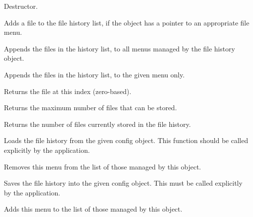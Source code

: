 Destructor.



Adds a file to the file history list, if the object has a pointer to an appropriate file menu.

\label{wxfilehistoryaddfilestomenu}


Appends the files in the history list, to all menus managed by the file history object.


Appends the files in the history list, to the given menu only.

\label{wxfilehistorygethistoryfile}


Returns the file at this index (zero-based).



Returns the maximum number of files that can be stored.



Returns the number of files currently stored in the file history.



Loads the file history from the given config object. This function should be called explicitly by the application.





Removes this menu from the list of those managed by this object.



Saves the file history into the given config object. This must be called
explicitly by the application.





Adds this menu to the list of those managed by this object.


